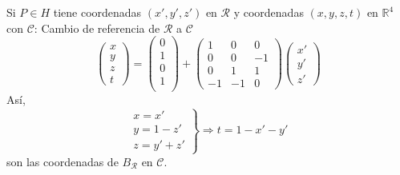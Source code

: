 \documentclass[12pt, a4paper, ones, notitlepage, openany,titlepage]{article}
\begin{document}
Si $P \in H$ tiene coordenadas $(x',y',z')$ en $\mathcal{R}$ y coordenadas $(x,y,z,t)$ en $\mathbb{R}^4$ con $\mathcal{C}$: Cambio de referencia de $\mathcal{R}$ a $\mathcal{C}$
$$
\begin{pmatrix}
	x \\
	y \\
	z \\
	t
\end{pmatrix} = \begin{pmatrix}
	0 \\
	1 \\
	0 \\
	1 \\ 
\end{pmatrix} + \begin{pmatrix}
	1 & 0 & 0 \\
	0 & 0 & -1 \\
	0 & 1 & 1 \\
	-1 & -1 & 0
\end{pmatrix} \begin{pmatrix}
	x' \\
	y' \\
	z'
\end{pmatrix}
$$
Así,
$$
\left. \begin{array}{r}
	x = x' \\
	y = 1 - z' \\
	z = y' + z'
\end{array} \right\} \Longrightarrow t = 1 - x' - y'
$$
son las coordenadas de $B_\mathcal{R}$ en $\mathcal{C}$.
\end{document}
